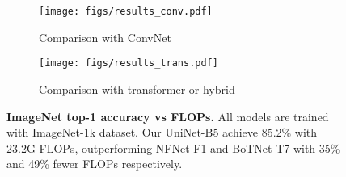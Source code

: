 \documentclass{article} \usepackage{iclr2022_conference,times}
\begin{document}
\begin{figure}[t]
    \centering
    \begin{subfigure}[b]{0.43\textwidth}
        \texttt{[image: figs/results\_conv.pdf]}
\caption{Comparison with ConvNet}
    \end{subfigure}
    \hspace{0.3em}
    \begin{subfigure}[b]{0.43\textwidth}
        \texttt{[image: figs/results\_trans.pdf]}
\caption{Comparison with transformer or hybrid}
    \end{subfigure}
\vspace{-1em}
    \caption{\textbf{ImageNet top-1 accuracy vs FLOPs.} All models are trained with ImageNet-1k dataset. Our UniNet-B5 achieve 85.2\% with 23.2G FLOPs, outperforming NFNet-F1 and BoTNet-T7 with 35\% and 49\% fewer FLOPs respectively.}
    \label{fig:sota}
    \vspace{-1em}
\end{figure}

\begin{table}[t]
\centering
{}
\vspace{-1em}
\caption{ImageNet top-1 accuracy of different operator combinations. T and M refer to transformer block and mlp-mixer block respectively. Different block numbers are used to keep them comparable.}
\vspace{-1.5em}
\label{pilot_study}
\end{table}
\end{document}
